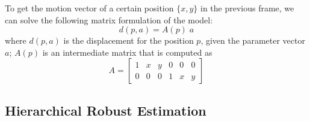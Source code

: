 To get the motion vector of a certain position $\{x,y\}$ in the previous frame, we can solve the following matrix formulation of the model:
\begin{equation}
    d(p, a) = A(p)\;a
\end{equation}
where $d(p, a)$ is the displacement for the position $p$, given the parameter vector $a$; $A(p)$ is an intermediate matrix that is computed as 
\begin{equation*}
    A = \begin{bmatrix}
        1 & x & y & 0 & 0 & 0 \\
        0 & 0 & 0 & 1 & x & y
    \end{bmatrix}
\end{equation*}





\subsection{Hierarchical Robust Estimation}